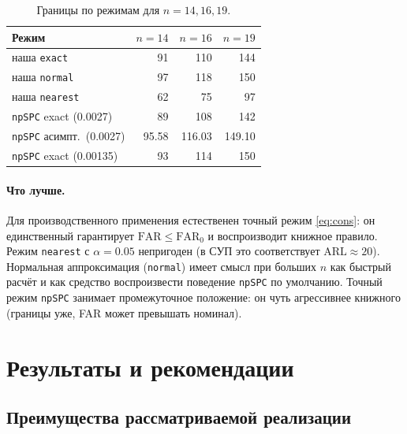 \documentclass[11pt,a4paper]{article}
\newcommand{\FAR}{\mathrm{FAR}}
\newcommand{\ARL}{\mathrm{ARL}}
\newcommand{\FARz}{\mathrm{FAR}_0}
\begin{document}
\begin{table}[htbp]\centering
\caption{Границы по режимам для $n=14,16,19$.}
\label{tab:modes-alln}
\small
\begin{tabular}{@{}l r r r@{}}
\toprule
Режим & $n=14$ & $n=16$ & $n=19$ \\
\midrule
наша \texttt{exact} & 91 & 110 & 144 \\
наша \texttt{normal} & 97 & 118 & 150 \\
наша \texttt{nearest} & 62 & 75 & 97 \\
\texttt{npSPC} exact (0.0027) & 89 & 108 & 142 \\
\texttt{npSPC} асимпт.\ (0.0027) & 95.58 & 116.03 & 149.10 \\
\texttt{npSPC} exact (0.00135) & 93 & 114 & 150 \\
\bottomrule
\end{tabular}
\normalsize
\end{table}

\paragraph{Что лучше.} Для производственного применения естественен
точный режим \eqref{eq:cons}: он единственный гарантирует
$\FAR\le\FARz$ и воспроизводит книжное правило. Режим \texttt{nearest} с
$\alpha=0.05$ непригоден (в СУП это соответствует $\ARL\approx20$).
Нормальная аппроксимация (\texttt{normal}) имеет смысл при больших $n$
как быстрый расчёт и как средство воспроизвести поведение
\texttt{npSPC} по умолчанию. Точный режим \texttt{npSPC} занимает
промежуточное положение: он чуть агрессивнее книжного (границы уже, FAR
может превышать номинал).

\section{Результаты и рекомендации}
\label{sec:results}

\subsection{Преимущества рассматриваемой реализации}
\label{sec:pros}
\end{document}
